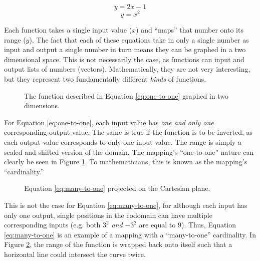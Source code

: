 \begin{equation} y = 2x - 1 \label{eq:one-to-one} \end{equation} 
\begin{equation} y = x^2  \label{eq:many-to-one}  \end{equation}

Each function takes a single input value ($x$) and ``maps'' that number onto its range ($y$). The fact that each of these equations take in only a single number as input and output a single number in turn means they can be graphed in a two dimensional space. This is not necessarily the case, as functions can input and output lists of numbers (vectors). Mathematically, they are not very interesting, but they represent two fundamentally different \emph{kinds} of functions.

\begin{figure}[h]
	\centering
\caption{The function described in Equation \ref{eq:one-to-one} graphed in two dimensions.}
\label{fig:one-to-one_graph}
\end{figure}

For Equation \ref{eq:one-to-one}, each input value has \emph{one and only one} corresponding output value. The same is true if the function is to be inverted, as each output value corresponds to only one input value. The range is simply a scaled and shifted version of the domain. The mapping's ``one-to-one'' nature can clearly be seen in Figure \ref{fig:one-to-one_graph}. To mathematicians, this is known as the mapping's ``cardinality.''

\begin{figure}[h]
	\centering
\caption{Equation \ref{eq:many-to-one} projected on the Cartesian plane.}
\label{fig:many-to-one_graph}
\end{figure}

This is not the case for Equation \ref{eq:many-to-one}, for although each input has only one output, single positions in the codomain can have multiple corresponding inputs (e.g. both $3^2$ \emph{and} $-3^2$ are equal to 9). Thus, Equation \ref{eq:many-to-one} is an example of a mapping with a ``many-to-one'' cardinality. In Figure \ref{fig:many-to-one_graph}, the range of the function is wrapped back onto itself such that a horizontal line could intersect the curve twice.

